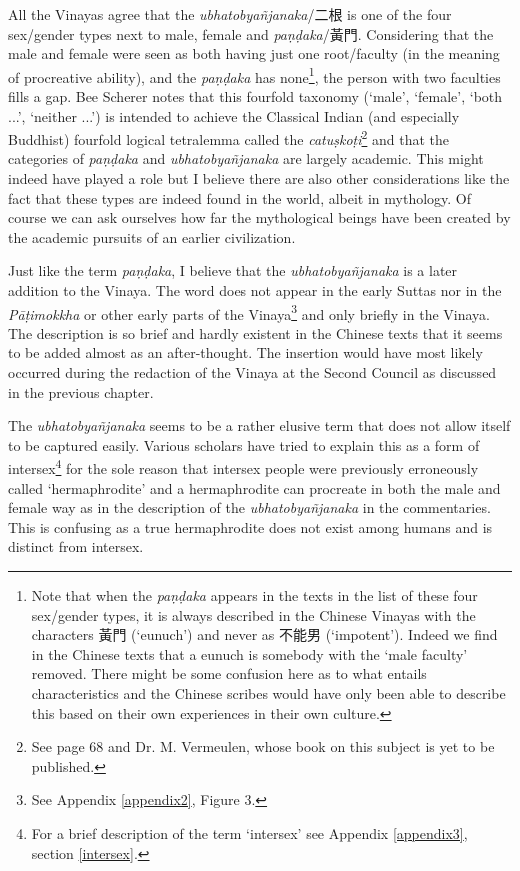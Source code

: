All the Vinayas agree that the {\em ubhatob­yañ­janaka}/二根 is one of the four sex/gender types next to male, female and {\em paṇḍaka}/黃門. Considering that the male and female were seen as both having just one root/faculty (in the meaning of procreative ability), and the {\em paṇḍaka} has none\footnote{Note that when the {\em paṇḍaka} appears in the texts in the list of these four sex/gender types, it is always described in the Chinese Vinayas with the characters 黃門 (`eunuch') and never as 不能男 (`impotent'). Indeed we find in the Chinese texts that a eunuch is somebody with the `male faculty' removed. There might be some confusion here as to what entails characteristics and the Chinese scribes would have only been able to describe this based on their own experiences in their own culture.}, the person with two faculties fills a gap. Bee Scherer notes that this fourfold taxonomy (`male', `female', `both ...', `neither ...') is intended to achieve the Classical Indian (and especially Buddhist) fourfold logical tetralemma called the {\em catuṣkoṭi}\footnote{See \cite{scherer} page 68 and Dr. M. Vermeulen, whose book on this subject is yet to be published.} and that the categories of {\em paṇḍaka} and {\em ubhatob­yañ­janaka} are largely academic. This might indeed have played a role but I believe there are also other considerations like the fact that these types are indeed found in the world, albeit in mythology. Of course we can ask ourselves how far the mythological beings have been created by the academic pursuits of an earlier civilization. 

Just like the term {\em paṇḍaka}, I believe that the {\em ubhatob­yañ­janaka} is a later addition to the Vinaya. The word does not appear in the early Suttas nor in the {\em Pāṭimokkha} or other early parts of the Vinaya\footnote{See Appendix \ref{appendix2}, Figure 3.} and only briefly in the Vinaya. The description is so brief and hardly existent in the Chinese texts that it seems to be added almost as an after-thought. The insertion would have most likely occurred during the redaction of the Vinaya at the Second Council as discussed in the previous chapter.

The {\em ubhatob­yañ­janaka} seems to be a rather elusive term that does not allow itself to be captured easily. Various scholars have tried to explain this as a form of intersex\footnote{For a brief description of the term `intersex' see Appendix \ref{appendix3}, section \ref{intersex}.} for the sole reason that intersex people were previously erroneously called `hermaphrodite' and a hermaphrodite can procreate in both the male and female way as in the description of the {\em ubhatob­yañ­janaka} in the commentaries. This is confusing as a true hermaphrodite does not exist among humans and is distinct from intersex. 


